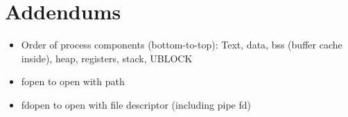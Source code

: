 
\section{Addendums}

\begin{itemize}
    \item Order of process components (bottom-to-top): Text, data, bss (buffer cache inside), heap, registers, stack, UBLOCK
    \item fopen to open with path
    \item fdopen to open with file descriptor (including pipe fd)
\end{itemize}